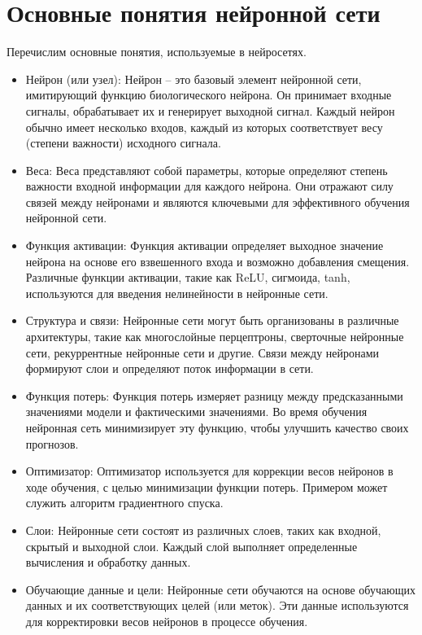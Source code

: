 \documentclass[12pt]{report}
\begin{document}
\section{Основные понятия нейронной сети}
Перечислим основные понятия, используемые в нейросетях.
\begin{itemize}
    \item Нейрон (или узел): Нейрон -- это базовый элемент нейронной сети, имитирующий функцию биологического нейрона. 
    Он принимает входные сигналы, обрабатывает их и генерирует выходной сигнал. 
    Каждый нейрон обычно имеет несколько входов, каждый из которых соответствует весу (степени важности) исходного сигнала.
    \item Веса: Веса представляют собой параметры, которые определяют степень важности входной информации для каждого нейрона.
    Они отражают силу связей между нейронами и являются ключевыми для эффективного обучения нейронной сети.
    \item Функция активации: Функция активации определяет выходное значение нейрона на основе его взвешенного входа и возможно добавления смещения. 
    Различные функции активации, такие как ReLU, сигмоида, tanh, используются для введения нелинейности в нейронные сети.
    \item Структура и связи:  Нейронные сети могут быть организованы в различные архитектуры, такие как многослойные перцептроны, сверточные нейронные сети, рекуррентные нейронные сети и другие. 
    Связи между нейронами формируют слои и определяют поток информации в сети.
    \item Функция потерь: Функция потерь измеряет разницу между предсказанными значениями модели и фактическими значениями. 
    Во время обучения нейронная сеть минимизирует эту функцию, чтобы улучшить качество своих прогнозов.
    \item Оптимизатор: Оптимизатор используется для коррекции весов нейронов в ходе обучения, с целью минимизации функции потерь.
    Примером может служить алгоритм градиентного спуска.
    \item Слои: Нейронные сети состоят из различных слоев, таких как входной, скрытый и выходной слои. 
    Каждый слой выполняет определенные вычисления и обработку данных.
    \item Обучающие данные и цели: Нейронные сети обучаются на основе обучающих данных и их соответствующих целей (или меток). 
    Эти данные используются для корректировки весов нейронов в процессе обучения.
\end{itemize}
\end{document}
